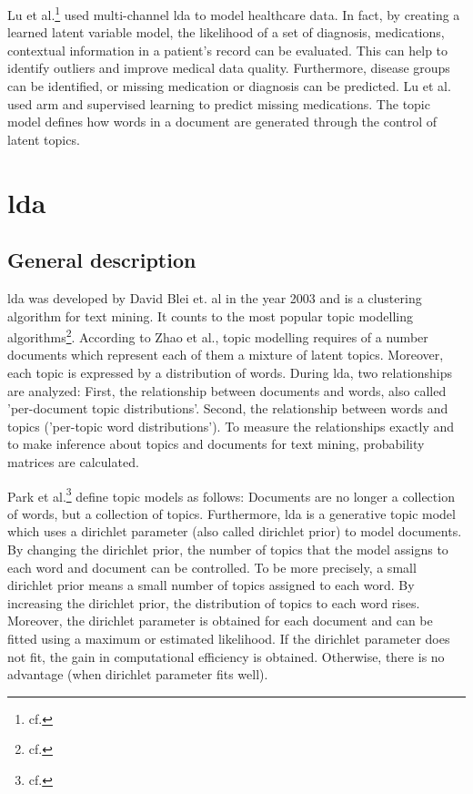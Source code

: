 Lu et al.\footnote{cf.\autocite{lu_2016}} used multi-channel \ac{lda} to model healthcare data. In fact, by creating a learned latent variable model, the likelihood of a set of diagnosis, medications, contextual information in a patient's record can be evaluated. This can help to identify outliers and improve medical data quality. Furthermore, disease groups can be identified,  or missing medication or diagnosis can be predicted. Lu et al. used \ac{arm} and supervised learning to predict missing medications. The topic model defines how words in a document are generated through the control of latent topics.

\chapter{\ac{lda}}\label{lda}
\section{General description}\label{lda_description}
\ac{lda} was developed by David Blei et. al in the year 2003 and is a clustering algorithm for text mining. It counts to the most popular topic modelling algorithms\footnote{cf.\autocite{zhao_2016}}.
According to Zhao et al., topic modelling requires of a number documents which represent each of them a mixture of latent topics. Moreover, each topic is expressed by a distribution of words. During \ac{lda}, two relationships are analyzed: First, the relationship between documents and words, also called 'per-document topic distributions'. Second, the relationship between words and topics ('per-topic word distributions'). To measure the relationships exactly and to make inference about topics and documents for text mining, probability matrices are calculated.

Park et al.\footnote{cf.\autocite{park_2009}} define topic models as follows: Documents are no longer a collection of words, but a collection of topics. Furthermore, \ac{lda} is a generative topic model which uses a dirichlet parameter (also called dirichlet prior) to model documents. By changing the dirichlet prior, the number of topics that the model assigns to each word and document can be controlled. To be more precisely, a small dirichlet prior means a small number of topics assigned to each word. By increasing the dirichlet prior, the distribution of topics to each word rises. Moreover, the dirichlet parameter is obtained for each document and can be fitted using a maximum or estimated likelihood. If the dirichlet parameter does not fit, the gain in computational efficiency is obtained. Otherwise, there is no advantage (when dirichlet parameter fits well).

